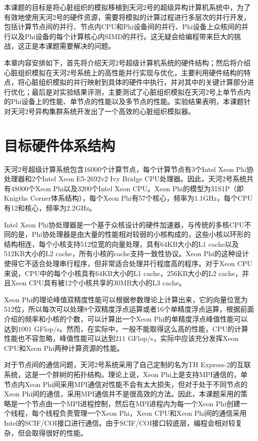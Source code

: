 本课题的目标是将心脏组织的模拟移植到天河2号的超级异构计算机系统中，为了有效地使用天河2号的硬件资源，需要将模拟的计算过程进行多层次的并行开发，包括计算节点间的并行、节点内CPU和Phi设备间的并行、Phi设备上众核间的并行以及Phi设备的每个计算核心内SIMD的并行。这无疑会给编程带来巨大的挑战，这正是本课题需要解决的问题。

本章内容安排如下，首先将介绍天河2号超级计算机系统的硬件结构；然后将介绍心脏组织模拟在天河2号系统上的高性能并行实现与优化，主要利用硬件结构的特点，将心脏组织模拟的并行映射到具体的硬件中执行，并对其中的关键计算部分进行优化；最后是对实验结果评测，主要测试了心脏组织模拟在天河2号上单节点内的Phi设备上的性能、单节点的性能以及多节点的性能。实验结果表明，本课题针对天河2号异构集群系统开发出了一个高效的心脏组织模拟器。

\section{目标硬件体系结构}

天河2号超级计算系统包含16000个计算节点，每个计算节点有3个Intel Xeon Phi协处理器和2个Intel Xeon E5-2692v2 Ivy Bridge CPU处理器。因此，天河2号系统共有48000个Xeon Phi以及3200个Intel Xeon CPU。Xeon Phi的模型为31S1P（即Knigths Corner体系结构），每个Xeon Phi有57个核心，频率为1.1GHz，每个CPU有12和核心，频率为2.2GHz。

Intel Xeon Phi协处理器是一个基于众核设计的硬件加速器，与传统的多核CPU不同的是，Phi协处理器是由大量的性能相对较弱的小核构成的，这些小核以环形的结构相连，每个小核支持512位宽的向量处理，具有64KB大小的L1 cache以及512KB大小的L2 cache，所有小核的cache支持一致性协议。Xeon Phi的这种设计使得它不适合处理串行程序，但非常适合处理并行程度高的程序。对于Xeon CPU来说，CPU中的每个小核具有64KB大小的L1 cache，256KB大小的L2 cache，并且Xeon CPU具有被12个小核共享的30MB大小的L3 cache。

Xeon Phi的理论峰值双精度性能可以根据参数理论上计算出来，它的向量位宽为512位，所以每次可以处理8个双精度浮点运算或者16个单精度浮点运算，根据前面介绍的频率和小核的个数，可以计算出一个Xeon Phi的单精度浮点峰值性能可以达到$1001$ GFlop/s。然而，在实际中，一般不能取得这么高的性能，CPU的计算性能也不容忽略，峰值性能可以达到$211$ GFlop/s，实际中应该充分发挥Xeon CPU和Xeon Phi两种计算资源的性能。

对于节点间的通信问题，天河2号系统采用了自己定制的名为TH Express-2的互联系统，这是一个胖树的拓扑结构。理论上说，Xeon Phi上是支持MPI通信的，单节点内Xeon Phi间采用MPI通信对性能不会有太大损失，但对于处于不同节点的Xeon Phi间的通信，采用MPI通信并不是很高效的方法。因此，本课题采用的策略是一个节点由一个MPI进程控制，然后在MPI进程内为每一个Xeon Phi创建一个线程，每个线程负责管理一个Xeon Phi，Xeon CPU和Xeon Phi间的通信采用Intel的SCIF/COI接口进行通信。由于SCIF/COI接口较底层，编程会相对较复杂，但会取得很好的性能。

